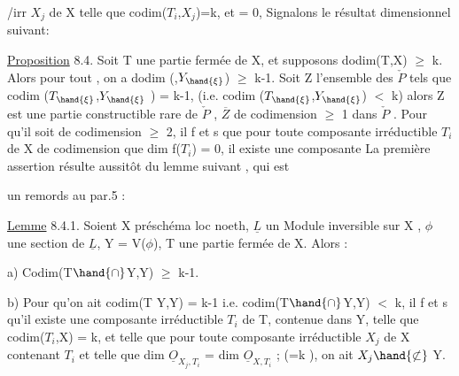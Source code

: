 /irr $X_j$ de X telle que codim($T_i$,$X_j$)=k, et  = 0, 
Signalons le résultat dimensionnel suivant:

\uline{Proposition} 8.4. Soit T une partie fermée de X, et supposons
dodim(T,X) $\geq$ k. Alors pour tout , on a dodim (,$Y_{\hand{\xi}}$) $\geq$ k-1. Soit
Z l'ensemble des \hand{$\xi\in$} $\check{P}$ tels que codim ($T_{\hand{\xi}}$,$Y_{\hand{\xi}}$ ) = k-1, (i.e.
codim ($T_{\hand{\xi}}$,$Y_{\hand{\xi}}$) $<$ k) alors Z est une partie constructible rare de $\check{P}$ ,
 $\overline{Z}$  de codimension $\geq$ 1 dans $\check{P}$ . Pour qu'il soit de
codimension $\geq$ 2, il f et s que pour toute composante irréductible
$T_i$ de X de codimension  
que dim f($T_i$) = 0, il existe une composante \hand{/}
La première assertion résulte aussitôt du lemme suivant , qui est

un remords au par.5 :

\uline{Lemme} 8.4.1. Soient X préschéma loc noeth, $\underline{L}$ un Module inversible sur
X , $\phi$ une section de $\underline{L}$, Y = V($\phi$), T une partie fermée de X.  Alors :

a) Codim(T$\hand{\cap}$Y,Y) $\geq$ k-1.

b) Pour qu'on ait codim(T Y,Y) = k-1 i.e. codim(T$\hand{\cap}$Y,Y) $<$ k, il
f et s qu'il existe une composante irréductible $T_i$ de T, contenue dans
Y,  telle que codim($T_i$,X) = k, et telle que pour toute composante
irréductible $X_j$ de X  contenant $T_i$ et telle que dim $\underline{O}_{X_j,T_i}$ =
dim $\underline{O}_{X,T_i}$ ; (=k ), on ait $X_j \hand{\not\subset}$ Y.

